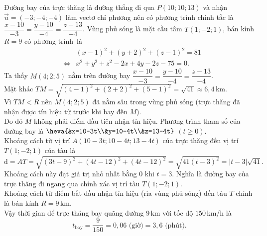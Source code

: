 \begin{ex}
{\begin{center}
		\end{center}
		\begin{itemchoice}
			\itemch 
			Đường bay của trực thăng là đường thẳng đi qua $P(10;10;13)$ và nhận $\overrightarrow{u}=(-3;-4;-4)$ làm vectơ chỉ phương nên có phương trình chính tắc là $\dfrac{x-10}{-3}=\dfrac{y-10}{-4}=\dfrac{z-13}{-4}$.
			\itemch 
			Vùng phủ sóng là mặt cầu tâm $T(1;-2;1)$, bán kính $R=9$ có phương trình là
			\allowdisplaybreaks
			\begin{eqnarray*}
				&&(x-1)^2+(y+2)^2+(z-1)^2=81\\
				&\Leftrightarrow&x^2+y^2+z^2-2x+4y-2z-75=0.
			\end{eqnarray*}
			\itemch 
			Ta thấy $M(4;2;5)$ nằm trên đường bay $\dfrac{x-10}{-3}=\dfrac{y-10}{-4}=\dfrac{z-13}{-4}$.\\
			Mặt khác $TM=\sqrt{(4-1)^2+(2+2)^2+(5-1)^2}=\sqrt{41}\approx 6{,}4$\,km.\\ 
			Vì $TM<R$ nên $M(4;2;5)$ đã nằm sâu trong vùng phủ sóng (trực thăng đã nhận được tín hiệu từ trước khi bay đến $M$).\\ 
			Do đó $M$ không phải điểm đầu tiên nhận tín hiệu.
			\itemch 
			Phương trình tham số của đường bay là $\heva{&x=10-3t\\&y=10-4t\\&z=13-4t}$ $(t\ge 0)$.\\
			Khoảng cách từ vị trí $A(10-3t; 10-4t;13-4t)$ của trực thăng đến vị trí $T (1; -2; 1)$ của tàu là
			\[\mathrm{d}=AT=\sqrt{(3t-9)^2+(4t-12)^2+(4t-12)^2}=\sqrt{41(t-3)^2}=|t-3|\sqrt{41}.\]
			Khoảng cách này đạt giá trị nhỏ nhất bằng $0$ khi $t=3$. Nghĩa là đường bay của trực thăng đi ngang qua chính xác vị trí tàu $T(1;-2;1)$.\\
			Khoảng cách từ điểm bắt đầu nhận tín hiệu (rìa vùng phủ sóng) đến tàu $T$ chính là bán kính $R=9$\,km.\\
			Vậy thời gian để trực thăng bay quãng đường $9$\,km với tốc độ $150$\,km/h là
			\[t_{\text{bay}}=\dfrac{9}{150}=0{,}06\text{ (giờ)}= 3{,}6\text{ (phút)}.\]
		\end{itemchoice}
	}
\end{ex}

